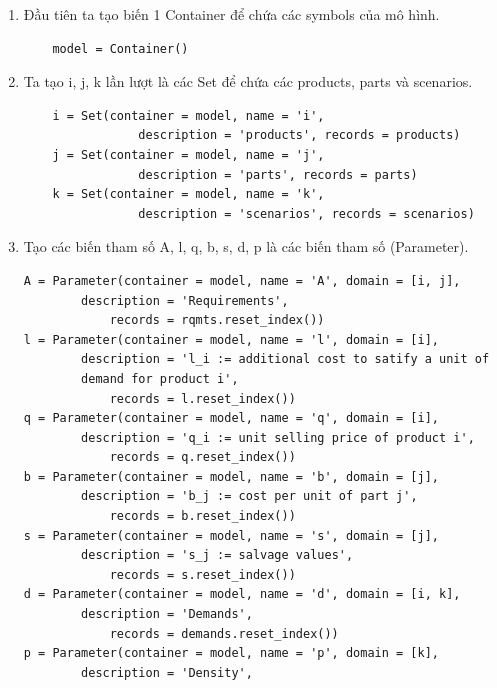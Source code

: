 \documentclass[a4paper]{article}
\begin{document}
\begin{enumerate}
    \item[] {Đầu tiên ta tạo biến 1 Container để chứa các symbols của mô hình.}
    
    \begin{tcolorbox}[colback=blue!5!white,colframe=blue!75!black]
        \begin{verbatim}
    model = Container()
        \end{verbatim}
    \end{tcolorbox}
    \item[] {Ta tạo i, j, k lần lượt là các Set để chứa các products, parts và scenarios.}
    \begin{tcolorbox}[colback=blue!5!white,colframe=blue!75!black]
    \begin{verbatim}
    i = Set(container = model, name = 'i',
                description = 'products', records = products)
    j = Set(container = model, name = 'j', 
                description = 'parts', records = parts)
    k = Set(container = model, name = 'k',
                description = 'scenarios', records = scenarios)
    \end{verbatim}
    \end{tcolorbox}
    \item[] {Tạo các biến tham số A, l, q, b, s, d, p là các biến tham số (Parameter).}
    \begin{tcolorbox}[colback=blue!5!white,colframe=blue!75!black]
    \begin{verbatim}
A = Parameter(container = model, name = 'A', domain = [i, j],
        description = 'Requirements', 
            records = rqmts.reset_index())
l = Parameter(container = model, name = 'l', domain = [i],
        description = 'l_i := additional cost to satify a unit of 
        demand for product i',
            records = l.reset_index())
q = Parameter(container = model, name = 'q', domain = [i],
        description = 'q_i := unit selling price of product i',
            records = q.reset_index())
b = Parameter(container = model, name = 'b', domain = [j],
        description = 'b_j := cost per unit of part j', 
            records = b.reset_index())
s = Parameter(container = model, name = 's', domain = [j],
        description = 's_j := salvage values', 
            records = s.reset_index())
d = Parameter(container = model, name = 'd', domain = [i, k], 
        description = 'Demands', 
            records = demands.reset_index())
p = Parameter(container = model, name = 'p', domain = [k], 
        description = 'Density',

\end{verbatim}
\end{tcolorbox}
\end{enumerate}
\end{document}
